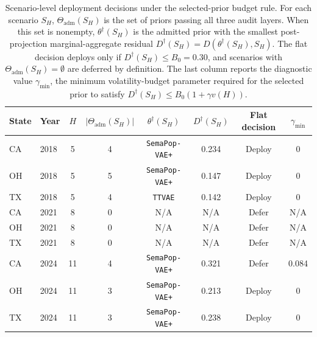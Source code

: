\begin{table}[htbp]
\centering
\caption{
Scenario-level deployment decisions under the selected-prior budget rule.
For each scenario \(S_H\), \(\Theta_{\mathrm{adm}}(S_H)\) is the set of priors
passing all three audit layers. When this set is nonempty,
\(\theta^\dagger(S_H)\) is the admitted prior with the smallest
post-projection marginal-aggregate residual
\(D^\dagger(S_H)=D(\theta^\dagger(S_H),S_H)\). The flat decision deploys only
if \(D^\dagger(S_H)\le B_0=0.30\), and scenarios with
\(\Theta_{\mathrm{adm}}(S_H)=\emptyset\) are deferred by definition.
The last column reports the diagnostic value \(\gamma_{\min}\), the minimum
volatility-budget parameter required for the selected prior to satisfy
\(D^\dagger(S_H)\le B_0(1+\gamma v(H))\).
}
\label{tab:selected-prior-budget}
\begin{tabular}{llcccccc}
\toprule
State & Year & \(H\) &
\(|\Theta_{\mathrm{adm}}(S_H)|\) &
\(\theta^\dagger(S_H)\) &
\(D^\dagger(S_H)\) &
Flat decision &
\(\gamma_{\min}\) \\
\midrule
CA & 2018 & 5  & 4 & \texttt{SemaPop-VAE+} & 0.234 & Deploy & 0 \\
OH & 2018 & 5  & 5 & \texttt{SemaPop-VAE+} & 0.147 & Deploy & 0 \\
TX & 2018 & 5  & 4 & \texttt{TTVAE} & 0.142 & Deploy & 0 \\
\midrule
CA & 2021 & 8  & 0 & N/A & N/A & Defer & N/A \\
OH & 2021 & 8  & 0 & N/A & N/A & Defer & N/A \\
TX & 2021 & 8  & 0 & N/A & N/A & Defer & N/A \\
\midrule
CA & 2024 & 11 & 4 & \texttt{SemaPop-VAE+} & 0.321 & Defer & 0.084 \\
OH & 2024 & 11 & 3 & \texttt{SemaPop-VAE+} & 0.213 & Deploy & 0 \\
TX & 2024 & 11 & 3 & \texttt{SemaPop-VAE+} & 0.238 & Deploy & 0 \\
\bottomrule
\end{tabular}
\end{table}
